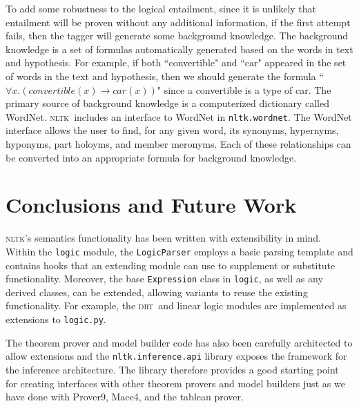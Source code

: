 \documentclass[11pt, a4paper]{article}
\newcommand{\DRT}{\textsc{drt}}
\newcommand{\NLTK}{\textsc{nltk}}
\newcommand{\dhgcode}[1]{{\tt #1}}
\begin{document}
To add some robustness to the logical entailment, since it is unlikely
that entailment will be proven without any additional information, if
the first attempt fails, then the tagger will generate some background
knowledge.  The background knowledge is a set of formulas
automatically generated based on the words in text and hypothesis.
For example, if both ``convertible" and ``car" appeared in the set of
words in the text and hypothesis, then we should generate the formula
``$\forall x.(convertible(x) \rightarrow car(x))$" since a convertible
is a type of car.  The primary source of background knowledge is a
computerized dictionary called WordNet.  \NLTK\ includes an interface
to WordNet in \dhgcode{nltk.wordnet}.  The WordNet interface allows
the user to find, for any given word, its synonyms, hypernyms,
hyponyms, part holoyms, and member meronyms.  Each of these
relationships can be converted into an appropriate formula for
background knowledge.


\section{Conclusions and Future Work}

\NLTK's semantics functionality has been written with extensibility in
mind.  Within the \texttt{logic} module, the \texttt{LogicParser}
employs a basic parsing template and contains hooks that an extending
module can use to supplement or substitute functionality.  Moreover, the
base \texttt{Expression} class in \texttt{logic}, as well as any
derived classes, can be extended, allowing variants to reuse the
existing functionality.  For example, the \DRT\ and linear logic modules
are implemented as extensions to \texttt{logic.py}.

The theorem prover and model builder code has also been carefully
architected to allow extensions and the \texttt{nltk.inference.api}
library exposes the framework for the inference architecture.  The
library therefore provides a good starting point for creating
interfaces with other theorem provers and model builders just as we
have done with Prover9, Mace4, and the tableau prover.  %
\end{document}
